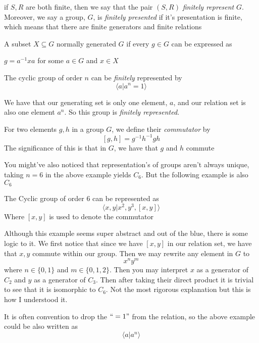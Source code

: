 \begin{definition}
    if $S,R$ are both finite, then we say that the pair $(S,R)$ \textit{finitely represent} $G$. Moreover, we say a group, $G$, is \textit{finitely presented} if it's presentation is finite, which means that there are finite generators and finite relations
\end{definition}
\begin{definition}
    A subset $X\subseteq G$ normally generated $G$ if every $g\in G$ can be expressed as
    \begin{center}
        $g=a^{-1}xa$ for some $a\in G$ and $x\in X$
    \end{center}
\end{definition}
\begin{example}
    The cyclic group of order $n$ can be \textit{finitely} represented by
    \[\langle a \vert a^n=1\rangle\]
\end{example}
We have that our generating set is only one element, $a$, and our relation set is also one element $a^n$. So this group is \textit{finitely represented}.
\begin{definition}[Commutator]
    For two elements $g,h$ in a group $G$, we define their \textit{commutator} by
    \[[g,h] = g^{-1}h^{-1}gh\]
    The significance of this is that in $G$, we have that $g$ and $h$ commute
\end{definition}
You might've also noticed that representation's of groups aren't always unique, taking $n=6$ in the above example yields \href{https://en.wikipedia.org/wiki/Cyclic_group}{$C_6$}. But the following example is also $C_6$
\begin{example}
    The Cyclic group of order 6 can be represented as
    \[\langle x,y\vert x^2,y^3,[x,y]\rangle\]
    Where $[x,y]$ is used to denote the commutator
\end{example}
Although this example seems super abstract and out of the blue, there is some logic to it. We first notice that since we have $[x,y]$ in our relation set, we have that $x,y$ commute within our group. Then we may rewrite any element in $G$ to
\[x^ny^m\]
where $n\in\{0,1\}$ and $m\in\{0,1,2\}$. Then you may interpret $x$ as a generator of $C_2$ and $y$ as a generator of $C_3$. Then after taking their direct product it is trivial to see that it is isomorphic to $C_6$. Not the most rigorous explanation but this is how I understood it.
\begin{remark}
    It is often convention to drop the $``=1"$ from the relation, so the above example could be also written as
     \[\langle a \vert a^n\rangle\]
\end{remark}
